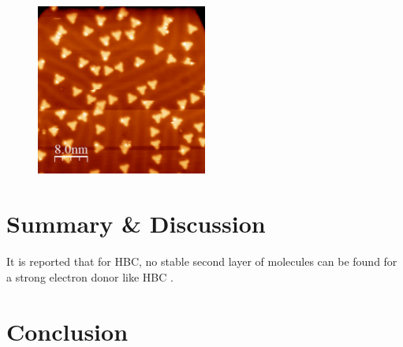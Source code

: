 \begin{figure}[] \centering
	\includegraphics[width=0.5\textwidth]{./images/hbbnc-au-111-rt}
	\caption{}
	\label{}
\end{figure}

\section{Summary \& Discussion}
It is reported that for HBC, no stable second layer of molecules can be found for a strong electron donor like HBC \cite{de_feyter_two-dimensional_2003}.

\section{Conclusion}